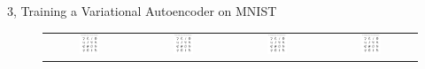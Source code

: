 \documentclass[10pt,a4paper]{article}
\begin{document}
\begin{task}{3, Training a Variational Autoencoder on MNIST}
\begin{enumerate}
\begin{figure}[H]
\begin{tabular}{cccc}
      \includegraphics[width=0.23\textwidth]{../plots/task3/real_epochs1_latent2.png} &   \includegraphics[width=0.23\textwidth]{../plots/task3/real_epochs5_latent2.png} & \includegraphics[width=0.23\textwidth]{../plots/task3/real_epochs25_latent2.png} &   \includegraphics[width=0.23\textwidth]{../plots/task3/real_epochs50_latent2.png} \\

\end{tabular}
\end{figure}
\end{enumerate}
\end{task}
\end{document}
